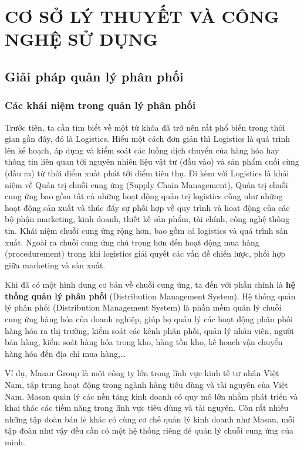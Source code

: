 \chapter{CƠ SỞ LÝ THUYẾT VÀ CÔNG NGHỆ SỬ DỤNG}

\section{Giải pháp quản lý phân phối}
\subsection{Các khái niệm trong quản lý phân phối}
Trước tiên, ta cần tìm biết về một từ khóa đã trở nên rất
phổ biến trong thời gian gần đây, đó là Logistics. Hiểu một cách đơn
giản thì Logistics là quá trình lên kế hoạch, áp dụng và kiểm soát
các luồng dịch chuyển của hàng hóa hay thông tin liên quan tới nguyên
nhiên liệu vật tư (đầu vào) và sản phẩm cuối cùng (đầu ra) từ thời
điểm xuất phát tới điểm tiêu thụ. Đi kèm với Logistics là khái niệm
về Quản trị chuỗi cung ứng (Supply Chain Management), Quản trị chuỗi
cung ứng bao gồm tất cả những hoạt động quản trị logistics cũng như
những hoạt động sản xuất và thúc đẩy sự phối hợp về quy trình và
hoạt động của các bộ phận marketing, kinh doanh, thiết kế sản phẩm,
tài chính, công nghệ thông tin. Khái niệm chuỗi cung ứng rộng hơn,
bao gồm cả logistics và quá trình sản xuất. Ngoài ra chuỗi cung ứng
chú trọng hơn đến hoạt động mua hàng (procedurement) trong khi
logistics giải quyết các vấn đề chiến lược, phối hợp giữa marketing và
sản xuất.

Khi đã có một hình dung cơ bản về chuỗi cung ứng, ta đến với
phần chính là \textbf{hệ thống quản lý phân phối}
(Distribution Management System). Hệ thống quản lý phân phối
(Distribution Management System) là phần mềm quản lý chuỗi
cung ứng hàng hóa của doanh nghiệp, giúp họ quản lý các hoạt
động phân phối hàng hóa ra thị trường, kiểm soát các kênh phân
phối, quản lý nhân viên, người bán hàng, kiểm soát hàng hóa
trong kho, hàng tồn kho, kế hoạch vận chuyển
hàng hóa đến địa chỉ mua hàng,…

Ví dụ, Masan Group là một công ty lớn trong lĩnh vực kinh tế
tư nhân Việt Nam, tập trung hoạt động trong ngành hàng tiêu dùng và
tài nguyên của Việt Nam. Masan quản lý các nền tảng kinh doanh có
quy mô lớn nhằm phát triển và khai thác các tiềm năng trong lĩnh vực
tiêu dùng và tài nguyên. Còn rất nhiều những tập đoàn bán lẻ khác
có cùng cơ chế quản lý kinh doanh như Masan, mỗi tập đoàn như vậy đều
cần có một hệ thống riêng để quản lý chuỗi cung ứng của mình.

